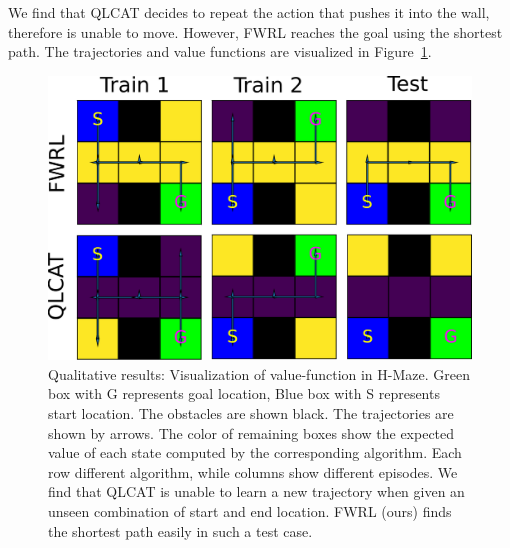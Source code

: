 We find that QLCAT decides to repeat the action that pushes it into the wall,
therefore is unable to move. However, FWRL reaches the goal using the shortest
path. The trajectories and value functions are visualized in Figure~\ref{fig:qualitative-results}.

\begin{figure}
  \includegraphics[width=\columnwidth]{./media/qualitative-results.pdf}
  \caption{Qualitative results: Visualization of value-function in H-Maze. Green
box with G represents goal location, Blue box with S represents start location.
The obstacles are shown black. The trajectories are shown by arrows. The color
of remaining boxes show the expected value of each state computed by the
corresponding algorithm. Each row different algorithm, while columns show
different episodes. We find that QLCAT is unable to learn a new trajectory
when given an unseen combination of start and end location. FWRL (ours) finds the
shortest path easily in such a test case. }
\label{fig:qualitative-results}
\end{figure}
